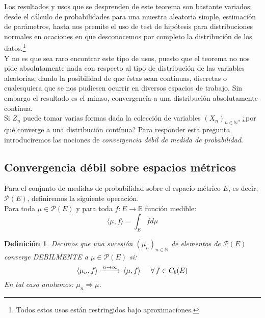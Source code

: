 \documentclass[a4paper]{article}
\newtheorem{definicion}{Definición}
\numberwithin{equation}{subsection}
\def\R{\mathbb R}
\def\N{\mathbb N}
\begin{document}
Los resultados y usos que se desprenden de este teorema son bastante variados; desde el cálculo de probabilidades para una muestra aleatoria simple, estimación de parámetros, hasta nos premite el uso de test de hipótesis para distribuciones normales en ocaciones en que desconocemos por completo la distribución de los datos.\footnote{Todos estos usos están restringidos bajo aproximaciones.}\\ \newline
Y no es que sea raro encontrar este tipo de usos, puesto que el teorema no nos pide absolutamente nada con respecto al tipo de  distribución de las variables aleatorias, dando la posibilidad de que éstas sean contínuas, discretas o cualesquiera que se nos pudiesen ocurrir en diversos espacios de trabajo. Sin embargo el resultado es el mimso, convergencia a una distribución absolutamente contínua.\\ \newline
Si $Z_n$ puede tomar varias formas dada la colección de variables $(X_n)_{n\in\N}$, ¿por qué converge a una distribución contínua? Para responder esta pregunta introduciremos las nociones de \textit{convergencia débil de medida de probabilidad}.\newpage

\subsection{Convergencia débil sobre espacios métricos}

Para el conjunto de medidas de probabilidad sobre el espacio métrico $E$, es decir; $\mathcal{P}(E)$, definiremos la siguiente operación.\\ Para toda $\mu \in \mathcal{P}(E)$ y para toda $f: E\rightarrow \R$ función medible:
\begin{equation}
    \langle \mu , f\rangle = \int_{E} f d\mu
\end{equation}
\begin{definicion} Decimos que una sucesión $(\mu_n)_{n\in\N}$ de elementos de $\mathcal{P}(E)$ converge DEBILMENTE a $\mu\in \mathcal{P}(E)$ si:
\[\langle \mu_n ,f\rangle\, \xrightarrow{n\rightarrow\infty}\, \langle \mu,f\rangle \hspace{0.5cm}\forall\,f\in C_b(E)\]
En tal caso anotamos: $\mu_n \Rightarrow \mu$.
\end{definicion}
\end{document}

